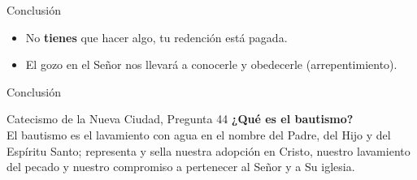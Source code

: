 \documentclass[17pt, aspectratio=169]{beamer}
\begin{document}

\begin{frame}{Conclusi\'on}
    \begin{itemize}
        \item No \textbf{tienes} que hacer algo, tu redenci\'on está pagada.
        \item El gozo en el Señor nos llevar\'a a conocerle y obedecerle (arrepentimiento).
    \end{itemize}
\end{frame}

\begin{frame}{Conclusi\'on}
    \begin{citaBiblicaSlide}{Catecismo de la Nueva Ciudad, Pregunta 44}
    \textbf{¿Qué es el bautismo?}\\
El bautismo es el lavamiento con agua en el nombre del Padre, del Hijo y del Espíritu Santo; representa y sella nuestra adopción en Cristo, nuestro lavamiento del pecado y nuestro compromiso a pertenecer al Señor y a Su iglesia.
    \end{citaBiblicaSlide}
\end{frame}
\end{document}
